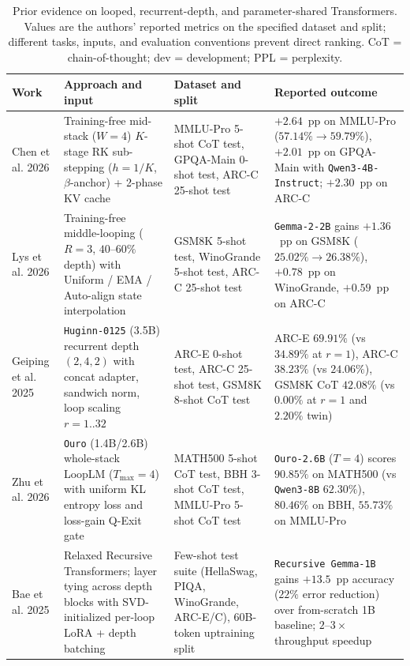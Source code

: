 \documentclass[11pt]{article}
\begin{document}
\begin{table}[h!]
\centering
\caption{Prior evidence on looped, recurrent-depth, and parameter-shared Transformers. Values are the authors' reported metrics on the specified dataset and split; different tasks, inputs, and evaluation conventions prevent direct ranking. CoT = chain-of-thought; dev = development; PPL = perplexity.}
\label{tab:sota}
\setlength{\tabcolsep}{3pt}
\renewcommand{\arraystretch}{1.05}
\scriptsize
\begin{tabularx}{\textwidth}{@{}p{2.2cm}p{3.8cm}X p{3.8cm}@{}}
\toprule
Work & Approach and input & Dataset and split & Reported outcome\\
\midrule
Chen et al. 2026 \cite{chen2026trainingfree} & Training-free mid-stack ($W=4$) $K$-stage RK sub-stepping ($h=1/K$, $\beta$-anchor) + 2-phase KV cache & MMLU-Pro 5-shot CoT test, GPQA-Main 0-shot test, ARC-C 25-shot test & $+2.64$~pp on MMLU-Pro ($57.14\% \rightarrow 59.79\%$), $+2.01$~pp on GPQA-Main with \texttt{Qwen3-4B-Instruct}; $+2.30$~pp on ARC-C\\
Lys et al. 2026 \cite{lys2026inner} & Training-free middle-looping ($R=3$, $40\text{--}60\%$ depth) with Uniform / EMA / Auto-align state interpolation & GSM8K 5-shot test, WinoGrande 5-shot test, ARC-C 25-shot test & \texttt{Gemma-2-2B} gains $+1.36$~pp on GSM8K ($25.02\% \rightarrow 26.38\%$), $+0.78$~pp on WinoGrande, $+0.59$~pp on ARC-C\\
Geiping et al. 2025 \cite{geiping2025scaling} & \texttt{Huginn-0125} (3.5B) recurrent depth $(2,4,2)$ with concat adapter, sandwich norm, loop scaling $r=1..32$ & ARC-E 0-shot test, ARC-C 25-shot test, GSM8K 8-shot CoT test & ARC-E $69.91\%$ (vs $34.89\%$ at $r=1$), ARC-C $38.23\%$ (vs $24.06\%$), GSM8K CoT $42.08\%$ (vs $0.00\%$ at $r=1$ and $2.20\%$ twin)\\
Zhu et al. 2026 \cite{zhu2026scaling} & \texttt{Ouro} (1.4B/2.6B) whole-stack LoopLM ($T_{\text{max}}=4$) with uniform KL entropy loss and loss-gain Q-Exit gate & MATH500 5-shot CoT test, BBH 3-shot CoT test, MMLU-Pro 5-shot CoT test & \texttt{Ouro-2.6B} ($T=4$) scores $90.85\%$ on MATH500 (vs \texttt{Qwen3-8B} $62.30\%$), $80.46\%$ on BBH, $55.73\%$ on MMLU-Pro\\
Bae et al. 2025 \cite{bae2025relaxed} & Relaxed Recursive Transformers; layer tying across depth blocks with SVD-initialized per-loop LoRA + depth batching & Few-shot test suite (HellaSwag, PIQA, WinoGrande, ARC-E/C), 60B-token uptraining split & \texttt{Recursive Gemma-1B} gains $+13.5$~pp accuracy ($22\%$ error reduction) over from-scratch 1B baseline; $2\text{--}3\times$ throughput speedup\\

\end{tabularx}
\end{table}
\end{document}
